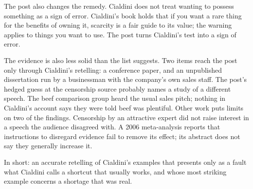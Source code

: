 \begin{afterword}
The post also changes the remedy. Cialdini does not treat wanting to possess something as a sign of error. Cialdini's book holds that if you want a rare thing for the benefits of owning it, scarcity is a fair guide to its value; the warning applies to things you want to use. The post turns Cialdini's test into a sign of error.

The evidence is also less solid than the list suggests. Two items reach the post only through Cialdini's retelling: a conference paper, and an unpublished dissertation run by a businessman with the company's own sales staff. The post's hedged guess at the censorship source probably names a study of a different speech. The beef comparison group heard the usual sales pitch; nothing in Cialdini's account says they were told beef was plentiful. Other work puts limits on two of the findings. Censorship by an attractive expert did not raise interest in a speech the audience disagreed with. A 2006 meta-analysis reports that instructions to disregard evidence fail to remove its effect; its abstract does not say they generally increase it.

In short: an accurate retelling of Cialdini's examples that presents only as a fault what Cialdini calls a shortcut that usually works, and whose most striking example concerns a shortage that was real.
\end{afterword}
